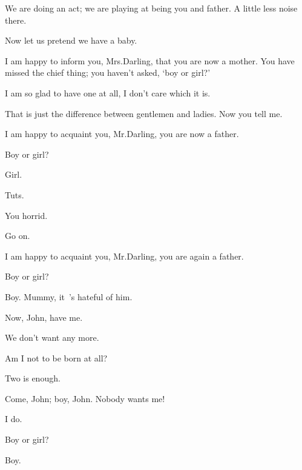 \begin{drama}
We are doing an act; we are playing at being you and father.
A little less noise there.

\wendyspeaks
Now let us pretend we have a baby.

I am happy to inform you, Mrs.\@ Darling, that you are now a mother.
You have missed the chief thing; you haven’t asked, ‘boy or girl?’

\wendyspeaks
I am so glad to have one at all, I don’t care which it is.

That is just the difference between gentlemen and ladies.
Now you tell me.

\wendyspeaks
I am happy to acquaint you, Mr.\@ Darling, you are now a father.

\johnspeaks
Boy or girl?

Girl.

\johnspeaks
Tuts.

\wendyspeaks
You horrid.

\johnspeaks
Go on.

\wendyspeaks
I am happy to acquaint you, Mr.\@ Darling, you are again a father.

\johnspeaks
Boy or girl?

\wendyspeaks
Boy.
Mummy, it~’s hateful of him.


Now, John, have me.

\johnspeaks
We don’t want any more.

Am I not to be born at all?

\johnspeaks
Two is enough.

Come, John; boy, John.
Nobody wants me!

\mrsdarlingspeaks
I do.

Boy or girl?

Boy.


\end{drama}
